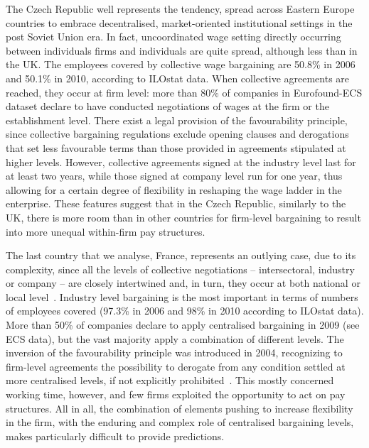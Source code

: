 \documentclass[12pt]{article}
\begin{document}
The Czech Republic well represents the tendency, spread across Eastern
Europe countries to embrace decentralised, market-oriented
institutional settings in the post Soviet Union era. In fact,
uncoordinated wage setting directly occurring between individuals firms
and individuals are quite spread, although less than in the UK. The
employees covered by collective wage bargaining are 50.8\% in 2006 and
50.1\% in 2010, according to ILOstat data. When collective agreements
are reached, they occur at firm level: more than 80\% of companies in
Eurofound-ECS dataset declare to have conducted negotiations of wages
at the firm or the establishment level. There exist a legal provision
of the favourability principle, since collective bargaining
regulations exclude opening clauses and derogations that set less
favourable terms than those provided in agreements stipulated at
higher levels. However, collective agreements signed at the industry
level last for at least two years, while those signed at company level
run for one year, thus allowing for a certain degree of flexibility in
reshaping the wage ladder in the enterprise. These features suggest
that in the Czech Republic, similarly to the UK, there is more room
than in other countries for firm-level bargaining to result into more
unequal within-firm pay structures.


The last country that we analyse, France, represents an outlying case,
due to its complexity, since all the levels of collective negotiations
-- intersectoral, industry or company -- are closely intertwined and,
in turn, they occur at both national or local
level~\citep{fulton.2013,fulton.2015}. Industry level bargaining is
the most important in terms of numbers of employees covered (97.3\% in
2006 and 98\% in 2010 according to ILOstat data).  More than 50\% of
companies declare to apply centralised bargaining in 2009 (see ECS
data), but the vast majority apply a combination of different levels.
The inversion of the favourability principle was introduced in 2004,
recognizing to firm-level agreements the possibility to derogate from
any condition settled at more centralised levels, if not explicitly
prohibited~\citep{keune2011decentralizing}.  This mostly concerned
working time, however, and few firms exploited the opportunity to act
on pay structures. All in all, the combination of elements pushing to
increase flexibility in the firm, with the enduring and complex role
of centralised bargaining levels, makes particularly difficult to
provide predictions.\\
\end{document}

